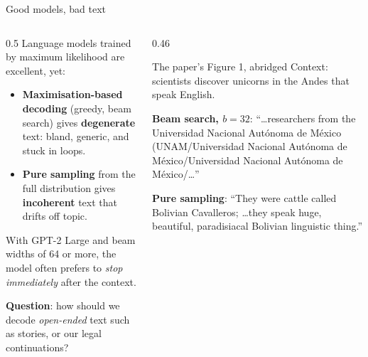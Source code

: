 \documentclass[aspectratio=169,11pt]{beamer}
\begin{document}
\begin{frame}{Good models, bad text}
  \begin{columns}[T]
    \begin{column}{0.5\textwidth}
      \small
      Language models trained by maximum likelihood are excellent, yet:
      \begin{itemize}
        \item \textbf{Maximisation-based decoding} (greedy, beam search) gives \textbf{degenerate} text: bland, generic, and stuck in loops.
        \item \textbf{Pure sampling} from the full distribution gives \textbf{incoherent} text that drifts off topic.
      \end{itemize}
      With GPT-2 Large and beam widths of 64 or more, the model often prefers to \emph{stop immediately} after the context.
      \vspace{1mm}

      \textbf{Question}: how should we decode \emph{open-ended} text such as stories, or our legal continuations?
    \end{column}
    \begin{column}{0.46\textwidth}
      \begin{exampleblock}{The paper's Figure 1, abridged}
        \scriptsize
        Context: scientists discover unicorns in the Andes that speak English.
        \vspace{1mm}

        \textbf{Beam search, $b=32$}: ``\ldots researchers from the Universidad Nacional Autónoma de México (UNAM/Universidad Nacional Autónoma de México/Universidad Nacional Autónoma de México/\ldots''
        \vspace{1mm}

        \textbf{Pure sampling}: ``They were cattle called Bolivian Cavalleros; \ldots they speak huge, beautiful, paradisiacal Bolivian linguistic thing.''
      \end{exampleblock}
    \end{column}
  \end{columns}
\end{frame}
\end{document}
